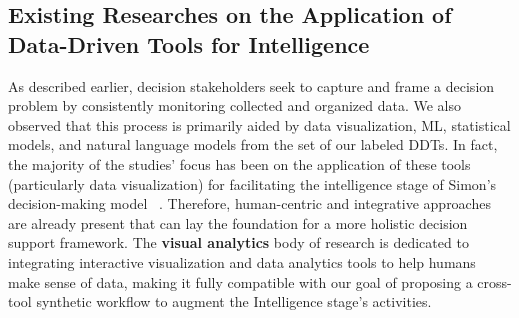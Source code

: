 \documentclass{sfuthesis}
\begin{document}
\subsection{Existing Researches on the Application of Data-Driven Tools for Intelligence} \label{ExistingResearchIntelligence}
As described earlier, decision stakeholders seek to capture and frame a decision problem by consistently monitoring collected and organized data. We also observed that this process is primarily aided by data visualization, ML, statistical models, and natural language models from the set of our labeled DDTs. In fact, the majority of the studies’ focus has been on the application of these tools (particularly data visualization) for facilitating the intelligence stage of Simon’s decision-making model ~\cite{dimara_critical_2022}. Therefore, human-centric and integrative approaches are already present that can lay the foundation for a more holistic decision support framework. The \textbf{visual analytics} body of research is dedicated to integrating interactive visualization and data analytics tools to help humans make sense of data, making it fully compatible with our goal of proposing a cross-tool synthetic workflow to augment the Intelligence stage’s activities.
\end{document}
